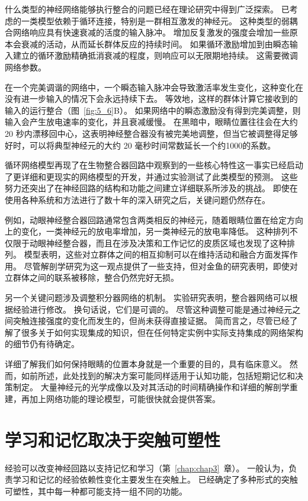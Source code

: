 什么类型的神经网络能够执行整合的问题已经在理论研究中得到广泛探索。 
已考虑的一类模型依赖于循环连接，特别是一群相互激发的神经元。 
这种类型的弱耦合网络响应具有快速衰减的活度的输入脉冲。
增加反复激发的强度会增加一些原本会衰减的活动，从而延长群体反应的持续时间。
如果循环激励增加到由瞬态输入建立的循环激励精确抵消衰减的程度，则响应可以无限期地持续。 这需要微调网络参数。


在一个完美调谐的网络中，一个瞬态输入脉冲会导致激活率发生变化，这种变化在没有进一步输入的情况下会永远持续下去。 
等效地，这样的群体计算它接收到的输入的运行整合（图~\ref{fig:5_6}B）。
如果网络中的瞬态激励没有得到完美调整，则输入会产生放电速率的变化，并且衰减缓慢。 
在黑暗中，眼睛位置往往会在大约 20 秒内漂移回中心，这表明神经整合器没有被完美地调整，但当它被调整得足够好时，可以将典型神经元的大约 20 毫秒时间常数延长一个约1000的系数。


循环网络模型再现了在生物整合器回路中观察到的一些核心特性这一事实已经启动了更详细和更现实的网络模型的开发，并通过实验测试了此类模型的预测。
这些努力还突出了在神经回路的结构和功能之间建立详细联系所涉及的挑战。
即使在使用各种系统和方法进行了数十年的深入研究之后，关键问题仍然存在。


例如，动眼神经整合器回路通常包含两类相反的神经元，随着眼睛位置在给定方向上的变化，一类神经元的放电率增加，另一类神经元的放电率降低。 
这种排列不仅限于动眼神经整合器，而且在涉及决策和工作记忆的皮质区域也发现了这种排列。
模型表明，这些对立群体之间的相互抑制可以在维持活动和融合方面发挥作用。 
尽管解剖学研究为这一观点提供了一些支持，但对金鱼的研究表明，即使对立群体之间的联系被移除，整合仍然完好无损。


另一个关键问题涉及调整积分器网络的机制。
实验研究表明，整合器网络可以根据经验进行修改。
换句话说，它们是可调的。 
尽管这种调整可能是通过神经元之间突触连接强度的变化而发生的，但尚未获得直接证据。 
简而言之，尽管已经了解了很多关于如何实现集成的知识，但在任何特定实例中实际支持集成的网络架构的细节仍有待确定。


详细了解我们如何保持眼睛的位置本身就是一个重要的目的，具有临床意义。 
然而，如前所述，此处找到的解决方案可能同样适用于认知功能，包括短期记忆和决策制定。
大量神经元的光学成像以及对其活动的时间精确操作和详细的解剖学重建，再加上网络功能的理论模型，可能很快就会提供答案。



\section{学习和记忆取决于突触可塑性}

经验可以改变神经回路以支持记忆和学习（第~\ref{chap:chap3}~章）。
一般认为，负责学习和记忆的经验依赖性变化主要发生在突触上。
已经确定了多种形式的突触可塑性，其中每一种都可能支持一组不同的功能。


